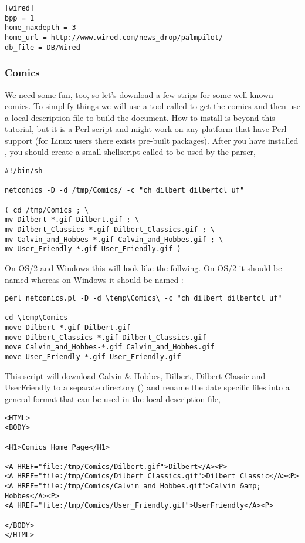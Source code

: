 \begin{verbatim}
[wired]
bpp = 1
home_maxdepth = 3
home_url = http://www.wired.com/news_drop/palmpilot/
db_file = DB/Wired
\end{verbatim}

\subsubsection{Comics}

We need some fun, too, so let's download a few strips for some well
known comics. To simplify things we will use a tool called 
to get the comics and then use a local description file to build the
document. How to install  is beyond this tutorial,
but it is a Perl script and might work on any platform that have Perl
support (for Linux users there exists pre-built packages). After you
have installed , you should create a small shellscript
called  to be used by the parser,

\begin{verbatim}
#!/bin/sh

netcomics -D -d /tmp/Comics/ -c "ch dilbert dilbertcl uf"

( cd /tmp/Comics ; \
mv Dilbert-*.gif Dilbert.gif ; \
mv Dilbert_Classics-*.gif Dilbert_Classics.gif ; \
mv Calvin_and_Hobbes-*.gif Calvin_and_Hobbes.gif ; \
mv User_Friendly-*.gif User_Friendly.gif )
\end{verbatim}

On OS/2 and Windows this will look like the follwing. On OS/2 it should
be named \code{netcomics.cmd} whereas on Windows it should be named 
:

\begin{verbatim}
perl netcomics.pl -D -d \temp\Comics\ -c "ch dilbert dilbertcl uf"

cd \temp\Comics
move Dilbert-*.gif Dilbert.gif
move Dilbert_Classics-*.gif Dilbert_Classics.gif
move Calvin_and_Hobbes-*.gif Calvin_and_Hobbes.gif
move User_Friendly-*.gif User_Friendly.gif

\end{verbatim}

This script will download Calvin \& Hobbes, Dilbert, Dilbert Classic
and UserFriendly to a separate directory () and
rename the date specific files into a general format that can be used
in the local description file,

\begin{verbatim}
<HTML>
<BODY>

<H1>Comics Home Page</H1>

<A HREF="file:/tmp/Comics/Dilbert.gif">Dilbert</A><P>
<A HREF="file:/tmp/Comics/Dilbert_Classics.gif">Dilbert Classic</A><P>
<A HREF="file:/tmp/Comics/Calvin_and_Hobbes.gif">Calvin &amp; Hobbes</A><P>
<A HREF="file:/tmp/Comics/User_Friendly.gif">UserFriendly</A><P>

</BODY>
</HTML>
\end{verbatim}

